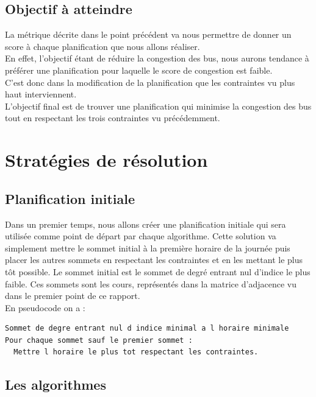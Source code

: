 \documentclass[a4paper,11pt]{article}
\begin{document}
	\subsection{Objectif à atteindre}
		La métrique décrite dans le point précédent va nous permettre de donner un score à chaque planification que nous allons réaliser.\\
		En effet, l'objectif étant de réduire la congestion des bus, nous aurons tendance à préférer une planification pour laquelle le score de congestion est faible.\\
		C'est donc dans la modification de la planification que les contraintes vu plus haut interviennent.\\
		L'objectif final est de trouver une planification qui minimise la congestion des bus tout en respectant les trois contraintes vu précédemment.
	
\section{Stratégies de résolution}
	\subsection{Planification initiale}
		Dans un premier temps, nous allons créer une planification initiale qui sera utilisée comme point de départ par chaque algorithme. Cette solution va simplement mettre le sommet initial à la première horaire de la journée puis placer les autres sommets en respectant les contraintes et en les mettant le plus tôt possible. Le sommet initial est le sommet de degré entrant nul d'indice le plus faible. Ces sommets sont les cours, représentés dans la matrice d'adjacence vu dans le premier point de ce rapport.\\
		En pseudocode on a :\\
		\begin{lstlisting}
Sommet de degre entrant nul d indice minimal a l horaire minimale
Pour chaque sommet sauf le premier sommet :
  Mettre l horaire le plus tot respectant les contraintes.
		\end{lstlisting}

	\subsection{Les algorithmes}
\end{document}
